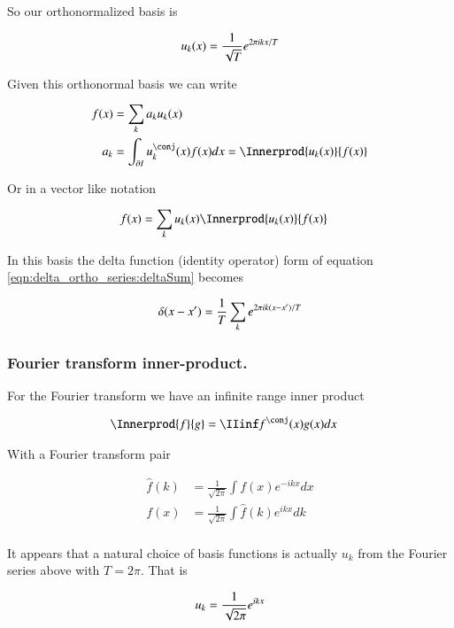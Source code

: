 So our orthonormalized basis is

\begin{align*}
u_k(x) = \frac{1}{\sqrt{T}} e^{ 2 \pi i k x / T}
\end{align*}

Given this orthonormal basis we can write 

\begin{align*}
f(x) 
&= \sum_k a_k u_k(x) \\
a_k &= \int_{\partial I} u_k^\conj(x) f(x) dx = \Innerprod{u_k(x)}{f(x)} \\
\end{align*}

Or in a vector like notation

\begin{align*}
f(x) &= \sum_k u_k(x) \Innerprod{u_k(x)}{f(x)}
\end{align*}

In this basis the 
delta function (identity operator) form of equation \ref{eqn:delta_ortho_series:deltaSum}
becomes

\begin{align*}
\delta(x- x') = \frac{1}{{T}} \sum_k e^{ 2 \pi i k (x-x') / T}
\end{align*}

\subsubsection{Fourier transform inner-product. }

For the Fourier transform we have an infinite range inner product

\begin{align*}
\Innerprod{f}{g} &= \IIinf f^\conj(x) g(x) dx
\end{align*}

With a Fourier transform pair 

\begin{align*}
\hat{f}(k) &= \frac{1}{\sqrt{2\pi}} \int f(x) e^{-i k x} dx \\
{f}(x) &= \frac{1}{\sqrt{2\pi}} \int \hat{f}(k) e^{i k x } dk \\
\end{align*}

It appears that a natural choice of basis functions is actually $u_k$ from the
Fourier series above with $T=2\pi$.  That is

\begin{align*}
u_k = \frac{1}{\sqrt{2\pi}} e^{i k x}
\end{align*}

